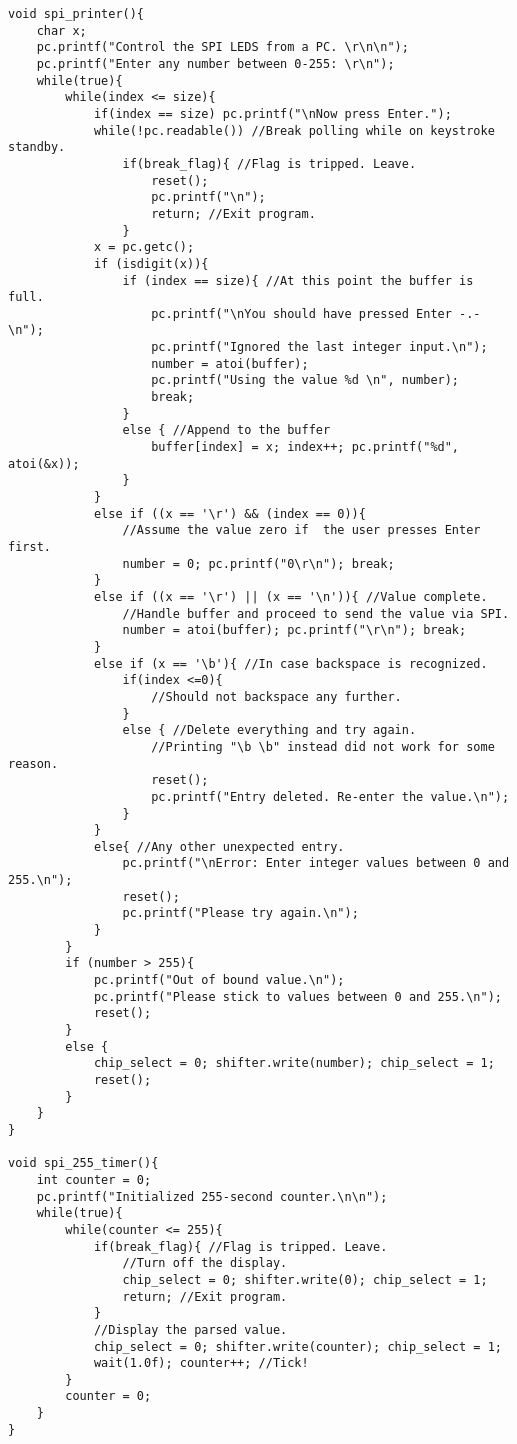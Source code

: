 \documentclass{article}
\begin{document}
\begin{verbatim}
void spi_printer(){
    char x;
    pc.printf("Control the SPI LEDS from a PC. \r\n\n");
    pc.printf("Enter any number between 0-255: \r\n");
    while(true){
        while(index <= size){
            if(index == size) pc.printf("\nNow press Enter.");
            while(!pc.readable()) //Break polling while on keystroke standby.
                if(break_flag){ //Flag is tripped. Leave.
                    reset();
                    pc.printf("\n");
                    return; //Exit program.
                }
            x = pc.getc();
            if (isdigit(x)){
                if (index == size){ //At this point the buffer is full.
                    pc.printf("\nYou should have pressed Enter -.-\n");
                    pc.printf("Ignored the last integer input.\n");
                    number = atoi(buffer);
                    pc.printf("Using the value %d \n", number);
                    break;
                }
                else { //Append to the buffer
                    buffer[index] = x; index++; pc.printf("%d", atoi(&x));
                }
            }
            else if ((x == '\r') && (index == 0)){
                //Assume the value zero if  the user presses Enter first.
                number = 0; pc.printf("0\r\n"); break;
            }
            else if ((x == '\r') || (x == '\n')){ //Value complete.
                //Handle buffer and proceed to send the value via SPI.
                number = atoi(buffer); pc.printf("\r\n"); break;
            }
            else if (x == '\b'){ //In case backspace is recognized.
                if(index <=0){
                    //Should not backspace any further.
                }
                else { //Delete everything and try again.
                    //Printing "\b \b" instead did not work for some reason.
                    reset();
                    pc.printf("Entry deleted. Re-enter the value.\n");
                }   
            }
            else{ //Any other unexpected entry.
                pc.printf("\nError: Enter integer values between 0 and 255.\n");
                reset();
                pc.printf("Please try again.\n");
            }
        }
        if (number > 255){
            pc.printf("Out of bound value.\n");
            pc.printf("Please stick to values between 0 and 255.\n");
            reset();
        }
        else {
            chip_select = 0; shifter.write(number); chip_select = 1;
            reset();
        }
    }
}

void spi_255_timer(){
    int counter = 0;
    pc.printf("Initialized 255-second counter.\n\n");
    while(true){
        while(counter <= 255){
            if(break_flag){ //Flag is tripped. Leave.
                //Turn off the display.
                chip_select = 0; shifter.write(0); chip_select = 1;
                return; //Exit program.
            }
            //Display the parsed value.
            chip_select = 0; shifter.write(counter); chip_select = 1;
            wait(1.0f); counter++; //Tick!
        }
        counter = 0;
    }
}


\end{verbatim}
\end{document}
